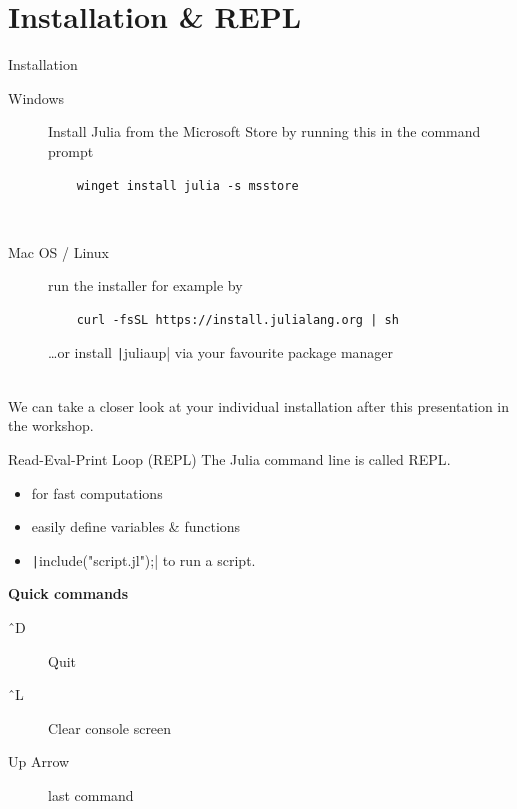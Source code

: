 \documentclass[aspectratio=169, 11pt, handout]{beamer}
\begin{document}
    \section{Installation \& REPL}
    \begin{frame}[fragile]{Installation}
        \begin{description}
            \item[Windows] Install Julia from the Microsoft Store by running this in the command prompt
            \begin{verbatim}
    winget install julia -s msstore
            \end{verbatim}
            \ \\
            \item[Mac OS / Linux] run the installer for example by
            \begin{verbatim}
    curl -fsSL https://install.julialang.org | sh
            \end{verbatim}
            \ldots or install \texttt|juliaup| via your favourite package manager
        \end{description}
        \ \\
        We can take a closer look at your individual installation after this presentation in the workshop.
    \end{frame}
    \begin{frame}{Read-Eval-Print Loop (REPL)}
        The Julia command line is called \alert{REPL}.
        \begin{itemize}
            \item for fast computations
            \item easily define variables \& functions
            \item \texttt|include("script.jl");| to run a script.
        \end{itemize}
        \vspace{\baselineskip}
        \pause
        \alert{\textbf{Quick commands}}
        \begin{description}
            \item[\^\ D] Quit
            \item[\^\ L] Clear console screen
            \item[Up Arrow] last command
        \end{description}
    \end{frame}
\end{document}
